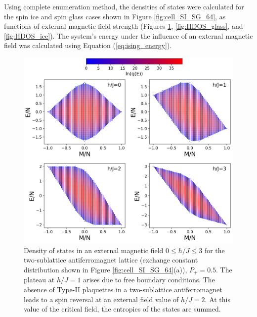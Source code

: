 \documentclass[preprint,12pt]{elsarticle}
\begin{document}
	Using complete enumeration method, the densities of states were calculated for the spin ice and spin glass cases shown in Figure \ref{fig:cell_SI_SG_64}, as functions of external magnetic field strength (Figures \ref{fig:HDOS_ice_1}, \ref{fig:HDOS_glass}, and \ref{fig:HDOS_ice}).
	The system's energy under the influence of an external magnetic field was calculated using Equation (\ref{eq:ising_energy}).
	
	\begin{figure}[H]
		\centering
		\includegraphics[width=1\linewidth]{pictures/HDOS_SI_64_J0_1.png}
		\caption{Density of states in an external magnetic field $0\leq h/J \leq 3$ for the two-sublattice antiferromagnet lattice (exchange constant distribution shown in Figure \ref{fig:cell_SI_SG_64}(a)), $P_+ = 0.5$. The plateau at $h/J=1$ arises due to free boundary conditions. The absence of Type-II plaquettes in a two-sublattice antiferromagnet leads to a spin reversal at an external field value of $h/J=2$. At this value of the critical field, the entropies of the states are summed.}
		\label{fig:HDOS_ice_1}
	\end{figure}
	
\end{document}
